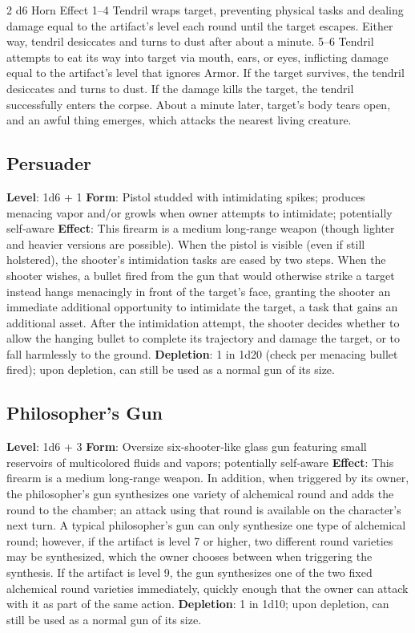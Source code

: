 \begin{multicols}{2}
d6 
Horn Effect 
1–4 
Tendril wraps target, preventing physical tasks and dealing damage equal to the artifact’s level each round until the target escapes. Either way, tendril desiccates and turns to dust after about a minute. 
5–6 
Tendril attempts to eat its way into target via mouth, ears, or eyes, inflicting damage equal to the artifact’s level that ignores Armor. If the target survives, the tendril desiccates and turns to dust. If the damage kills the target, the tendril successfully enters the corpse. About a minute later, target’s body tears open, and an awful thing emerges, which attacks the nearest living creature.

\subsection{Persuader }
\textbf{Level}: 1d6 + 1 
\textbf{Form}: Pistol studded with intimidating spikes; produces menacing vapor and/or growls when owner attempts to intimidate; potentially self‑aware 
\textbf{Effect}: This firearm is a medium long‑range weapon (though lighter and heavier versions are possible). When the pistol is visible (even if still holstered), the shooter’s intimidation tasks are eased by two steps. 
When the shooter wishes, a bullet fired from the gun that would otherwise strike a target instead hangs menacingly in front of the target’s face, granting the shooter an immediate additional opportunity to intimidate the target, a task that gains an additional asset. After the intimidation attempt, the shooter decides whether to allow the hanging bullet to complete its trajectory and damage the target, or to fall harmlessly to the ground. 
\textbf{Depletion}: 1 in 1d20 (check per menacing bullet fired); upon depletion, can still be used as a normal gun of its size.

\subsection{Philosopher’s Gun}
\textbf{Level}: 1d6 + 3 
\textbf{Form}: Oversize six‑shooter‑like glass gun featuring small reservoirs of multicolored fluids and vapors; potentially self‑aware 
\textbf{Effect}: This firearm is a medium long‑range weapon. In addition, when triggered by its owner, the philosopher’s gun synthesizes one variety of alchemical round and adds the round to the chamber; an attack using that round is available on the character’s next turn. A typical philosopher’s gun can only synthesize one type of alchemical round; however, if the artifact is level 7 or higher, two different round varieties may be synthesized, which the owner chooses between when triggering the synthesis. If the artifact is level 9, the gun synthesizes one of the two fixed alchemical round varieties immediately, quickly enough that the owner can attack with it as part of the same action. 
\textbf{Depletion}: 1 in 1d10; upon depletion, can still be used as a normal gun of its size.


\end{multicols}
